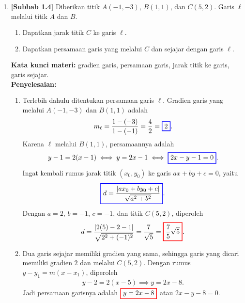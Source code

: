 \documentclass[10pt,openany,a4paper]{article}
\theoremstyle{definition}
\theoremstyle{definition}
\theoremstyle{plain}
\newenvironment{jawab}[2][tes]{%
\par\noindent\textbf{Kata kunci materi:} #1.\\
\textbf{Penyelesaian:} #2%
}{}
\begin{document}
\begin{enumerate}
    \item \textbf{[Subbab 1.4]} Diberikan titik $A(-1,-3)$, $B(1,1)$, dan $C(5,2)$. Garis $\ell$ melalui titik $A$ dan $B$.
    \begin{enumerate}
        \item Dapatkan jarak titik $C$ ke garis $\ell$.
        \item Dapatkan persamaan garis yang melalui $C$ dan sejajar dengan garis $\ell$.
    \end{enumerate}
    \begin{jawab}[gradien garis, persamaan garis, jarak titik ke garis, garis sejajar]{
        \begin{enumerate}
            \item Terlebih dahulu ditentukan persamaan garis $\ell$. Gradien garis yang melalui $A(-1,-3)$ dan $B(1,1)$ adalah
            \begin{align*}
                m_\ell = \frac{1-(-3)}{1-(-1)} = \frac{4}{2} = \colorlet{oldcolor}{.}
        \color{blue}
        \setlength{\fboxrule}{1pt} \boxed{\color{oldcolor}2}\color{oldcolor}.
            \end{align*}
            Karena $\ell$ melalui $B(1,1)$, persamaannya adalah
            \begin{align*}
                y-1=2(x-1) \iff y=2x-1 \iff \colorlet{oldcolor}{.}
        \color{blue}
        \setlength{\fboxrule}{1pt} \boxed{\color{oldcolor}2x-y-1=0}\color{oldcolor}.
            \end{align*}
            Ingat kembali rumus jarak titik $(x_0,y_0)$ ke garis $ax+by+c=0$, yaitu
            \begin{align*}
                \colorlet{oldcolor}{.}
        \color{blue}
        \setlength{\fboxrule}{1pt} \boxed{\color{oldcolor}d = \frac{|ax_0+by_0+c|}{\sqrt{a^2+b^2}}}\color{oldcolor}.
            \end{align*}
            Dengan $a=2$, $b=-1$, $c=-1$, dan titik $C(5,2)$, diperoleh
            \begin{align*}
                d = \frac{|2(5)-2-1|}{\sqrt{2^2+(-1)^2}} = \frac{7}{\sqrt{5}} = \colorlet{oldcolor}{.}
        \color{red}
        \setlength{\fboxrule}{1pt} \boxed{\color{oldcolor}\frac{7}{5}\sqrt{5}}\color{oldcolor}.
            \end{align*}
            \item Dua garis sejajar memiliki gradien yang sama, sehingga garis yang dicari memiliki gradien $2$ dan melalui $C(5,2)$. Dengan rumus $y - y_1 = m(x - x_1)$, diperoleh
            \begin{align*}
                y - 2 = 2(x - 5) \implies y = 2x - 8.
            \end{align*}
            Jadi persamaan garisnya adalah $\colorlet{oldcolor}{.}
        \color{red}
        \setlength{\fboxrule}{1pt} \boxed{\color{oldcolor}y = 2x - 8}\color{oldcolor}$ atau $2x-y-8=0$.
        \end{enumerate}
    }
    \end{jawab}


\end{enumerate}
\end{document}
